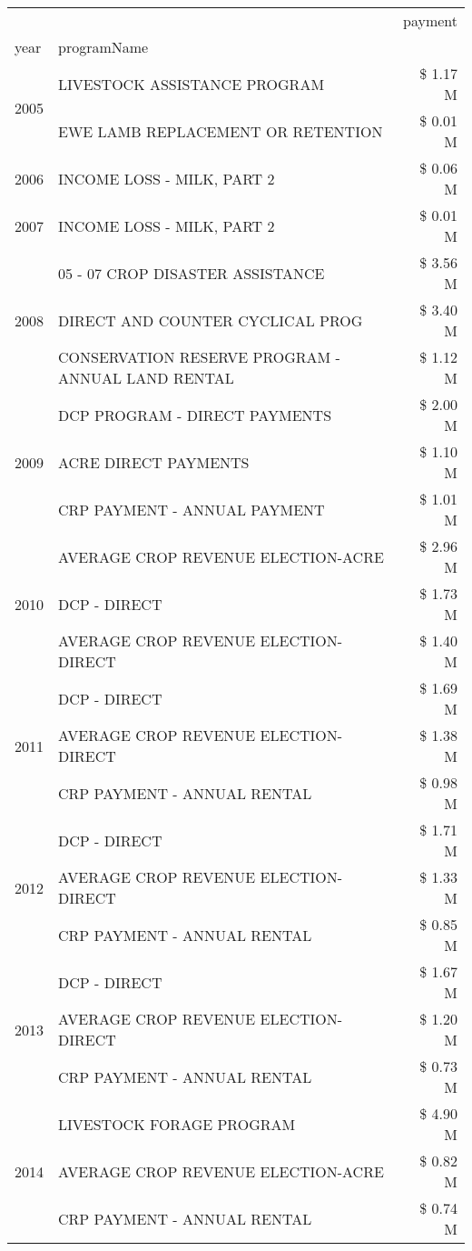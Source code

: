 \begin{tabular}{llr}
\toprule
 &  & payment \\
year & programName &  \\
\midrule
\multirow[t]{2}{*}{2005} & LIVESTOCK ASSISTANCE PROGRAM & \$ 1.17 M \\
 & EWE LAMB REPLACEMENT OR RETENTION & \$ 0.01 M \\
\cline{1-3}
2006 & INCOME LOSS - MILK, PART 2 & \$ 0.06 M \\
\cline{1-3}
2007 & INCOME LOSS - MILK, PART 2 & \$ 0.01 M \\
\cline{1-3}
\multirow[t]{3}{*}{2008} & 05 - 07 CROP DISASTER ASSISTANCE & \$ 3.56 M \\
 & DIRECT AND COUNTER CYCLICAL PROG & \$ 3.40 M \\
 & CONSERVATION RESERVE PROGRAM - ANNUAL LAND RENTAL & \$ 1.12 M \\
\cline{1-3}
\multirow[t]{3}{*}{2009} & DCP PROGRAM - DIRECT PAYMENTS & \$ 2.00 M \\
 & ACRE DIRECT PAYMENTS & \$ 1.10 M \\
 & CRP PAYMENT - ANNUAL PAYMENT & \$ 1.01 M \\
\cline{1-3}
\multirow[t]{3}{*}{2010} & AVERAGE CROP REVENUE ELECTION-ACRE & \$ 2.96 M \\
 & DCP - DIRECT & \$ 1.73 M \\
 & AVERAGE CROP REVENUE ELECTION-DIRECT & \$ 1.40 M \\
\cline{1-3}
\multirow[t]{3}{*}{2011} & DCP - DIRECT & \$ 1.69 M \\
 & AVERAGE CROP REVENUE ELECTION-DIRECT & \$ 1.38 M \\
 & CRP PAYMENT - ANNUAL RENTAL & \$ 0.98 M \\
\cline{1-3}
\multirow[t]{3}{*}{2012} & DCP - DIRECT & \$ 1.71 M \\
 & AVERAGE CROP REVENUE ELECTION-DIRECT & \$ 1.33 M \\
 & CRP PAYMENT - ANNUAL RENTAL & \$ 0.85 M \\
\cline{1-3}
\multirow[t]{3}{*}{2013} & DCP - DIRECT & \$ 1.67 M \\
 & AVERAGE CROP REVENUE ELECTION-DIRECT & \$ 1.20 M \\
 & CRP PAYMENT - ANNUAL RENTAL & \$ 0.73 M \\
\cline{1-3}
\multirow[t]{3}{*}{2014} & LIVESTOCK FORAGE PROGRAM & \$ 4.90 M \\
 & AVERAGE CROP REVENUE ELECTION-ACRE & \$ 0.82 M \\
 & CRP PAYMENT - ANNUAL RENTAL & \$ 0.74 M \\

\end{tabular}
